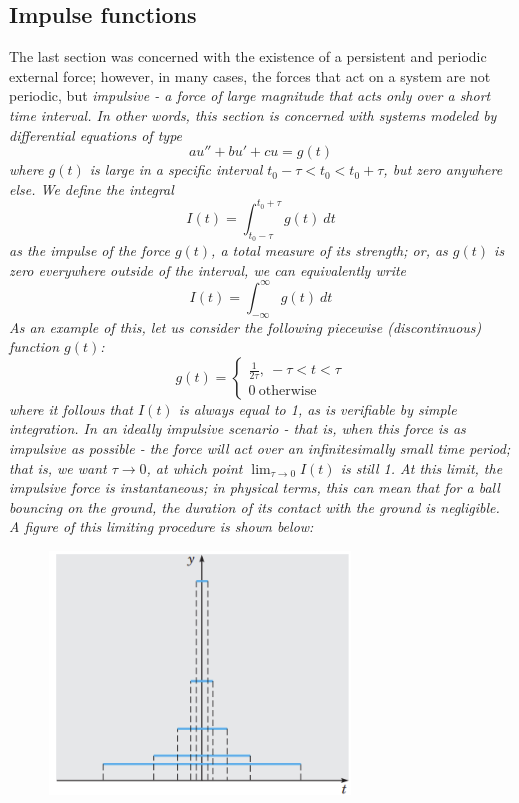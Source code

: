 \documentclass{article}
\begin{document}
\subsection{Impulse functions}
The last section was concerned with the existence of a persistent and periodic external force; however, in many cases, the forces that act on a system are not periodic, but \it impulsive \normalfont- a force of large magnitude that acts only over a short time interval. In other words, this section is concerned with systems modeled by differential equations of type
\begin{equation*}
    au'' + bu' + cu = g(t)
\end{equation*}
where $g(t)$ is large in a specific interval $t_0 - \tau < t_0 < t_0 + \tau$, but zero anywhere else. We define the integral
\begin{equation*}
    I(t) = \int_{t_0-\tau}^{t_0+\tau} g(t)\ dt
\end{equation*}
as the \it impulse \normalfont of the force $g(t)$, a total measure of its strength; or, as $g(t)$ is zero everywhere outside of the interval, we can equivalently write
\begin{equation*}
    I(t) = \int_{-\infty}^{\infty} g(t)\ dt
\end{equation*}
As an example of this, let us consider the following piecewise (discontinuous) function $g(t)$:
\begin{equation*}
    g(t) = \begin{cases}
        \frac{1}{2\tau},\ -\tau < t < \tau\\
        0\ \text{otherwise}
    \end{cases}
\end{equation*}
where it follows that $I(t)$ is always equal to 1, as is verifiable by simple integration. In an ideally impulsive scenario - that is, when this force is as impulsive as possible - the force will act over an infinitesimally small time period; that is, we want $\tau \to 0$, at which point $\lim_{\tau \to 0}I(t)$ is still 1. At this limit, the impulsive force is instantaneous; in physical terms, this can mean that for a ball bouncing on the ground, the duration of its contact with the ground is negligible. A figure of this limiting procedure is shown below:
\begin{figure}[h]
    \centering
    \includegraphics[width=8cm]{DE-ch3-diracdelta.png}
\end{figure}
\end{document}
